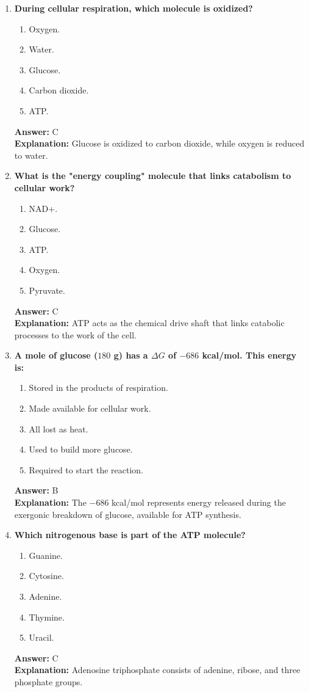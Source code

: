 \documentclass[11pt, a4paper]{article}
\begin{document}
\begin{enumerate}[leftmargin=*, label=\arabic*.]
\item \textbf{During cellular respiration, which molecule is oxidized?}
\begin{enumerate}[label=\Alph*.]
    \item Oxygen.
    \item Water.
    \item Glucose.
    \item Carbon dioxide.
    \item ATP.
\end{enumerate}
\textbf{Answer:} C \\
\textbf{Explanation:} Glucose is oxidized to carbon dioxide, while oxygen is reduced to water.

\item \textbf{What is the "energy coupling" molecule that links catabolism to cellular work?}
\begin{enumerate}[label=\Alph*.]
    \item NAD+.
    \item Glucose.
    \item ATP.
    \item Oxygen.
    \item Pyruvate.
\end{enumerate}
\textbf{Answer:} C \\
\textbf{Explanation:} ATP acts as the chemical drive shaft that links catabolic processes to the work of the cell.

\item \textbf{A mole of glucose ($180$ g) has a $\Delta G$ of $-686$ kcal/mol. This energy is:}
\begin{enumerate}[label=\Alph*.]
    \item Stored in the products of respiration.
    \item Made available for cellular work.
    \item All lost as heat.
    \item Used to build more glucose.
    \item Required to start the reaction.
\end{enumerate}
\textbf{Answer:} B \\
\textbf{Explanation:} The $-686$ kcal/mol represents energy released during the exergonic breakdown of glucose, available for ATP synthesis.

\item \textbf{Which nitrogenous base is part of the ATP molecule?}
\begin{enumerate}[label=\Alph*.]
    \item Guanine.
    \item Cytosine.
    \item Adenine.
    \item Thymine.
    \item Uracil.
\end{enumerate}
\textbf{Answer:} C \\
\textbf{Explanation:} Adenosine triphosphate consists of adenine, ribose, and three phosphate groups.


\end{enumerate}
\end{document}
